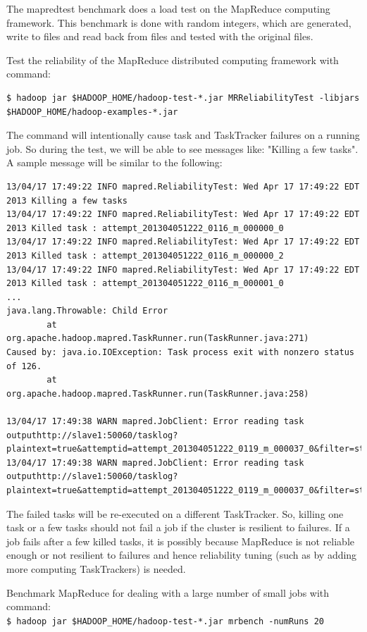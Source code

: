 The mapredtest benchmark does a load test on the MapReduce computing framework. This benchmark is done with random integers, which are generated, write to files and read back from files and tested with the original files.

Test the reliability of the MapReduce distributed computing framework with command:
\lstset{style=bashstyle}
\begin{lstlisting}
$ hadoop jar $HADOOP_HOME/hadoop-test-*.jar MRReliabilityTest -libjars $HADOOP_HOME/hadoop-examples-*.jar
\end{lstlisting}

The command will intentionally cause task and TaskTracker failures on a running job.  So during the test, we will be able to see messages like: "Killing a few tasks". A sample message will be similar to the following:
\lstset{style=bashstyle}
\begin{lstlisting}
13/04/17 17:49:22 INFO mapred.ReliabilityTest: Wed Apr 17 17:49:22 EDT 2013 Killing a few tasks
13/04/17 17:49:22 INFO mapred.ReliabilityTest: Wed Apr 17 17:49:22 EDT 2013 Killed task : attempt_201304051222_0116_m_000000_0
13/04/17 17:49:22 INFO mapred.ReliabilityTest: Wed Apr 17 17:49:22 EDT 2013 Killed task : attempt_201304051222_0116_m_000000_2
13/04/17 17:49:22 INFO mapred.ReliabilityTest: Wed Apr 17 17:49:22 EDT 2013 Killed task : attempt_201304051222_0116_m_000001_0
...
java.lang.Throwable: Child Error
        at org.apache.hadoop.mapred.TaskRunner.run(TaskRunner.java:271)
Caused by: java.io.IOException: Task process exit with nonzero status of 126.
        at org.apache.hadoop.mapred.TaskRunner.run(TaskRunner.java:258)

13/04/17 17:49:38 WARN mapred.JobClient: Error reading task outputhttp://slave1:50060/tasklog?plaintext=true&attemptid=attempt_201304051222_0119_m_000037_0&filter=stdout
13/04/17 17:49:38 WARN mapred.JobClient: Error reading task outputhttp://slave1:50060/tasklog?plaintext=true&attemptid=attempt_201304051222_0119_m_000037_0&filter=stderr
\end{lstlisting}

The failed tasks will be re-executed on a different TaskTracker. So, killing one task or a few tasks should not fail a job if the cluster is resilient to failures. If a job fails after a few killed tasks, it is possibly because MapReduce is not reliable enough or not resilient to failures and hence reliability tuning (such as by adding more computing TaskTrackers) is needed.

Benchmark MapReduce for dealing with a large number of small jobs with command: \\
\verb|$ hadoop jar $HADOOP_HOME/hadoop-test-*.jar mrbench -numRuns 20|

